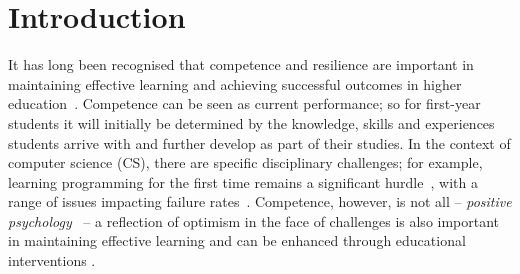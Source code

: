 \documentclass[sigconf]{acmart}
\begin{document}
%
\maketitle

\section{Introduction}
It has long been recognised that competence and resilience are important in maintaining effective learning and achieving successful outcomes in higher education~\cite{Marsten95,Walker2006,Holdsworth2018}. Competence can be seen as current performance; so for first-year students it will initially be determined by the knowledge, skills and experiences students arrive with and further develop as part of their studies. In the context of computer science (CS), there are specific disciplinary challenges; for example, learning programming for the first time remains a significant hurdle~\cite{davenport-et-al:latice2016,murphy-et-al:programming2017,simon-et-al:sigcse2018}, with a range of issues impacting failure rates~\cite{Watson:2014:FRI:2591708.2591749}. Competence, however, is not all -- {\emph{positive psychology}}~\cite{Seligman90} -- a reflection of optimism in the face of challenges is also important in maintaining effective learning and can be enhanced through educational interventions \cite{Walker2006,Holdsworth2018}.

\end{document}
